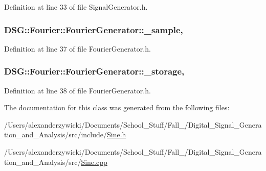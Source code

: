 Definition at line 33 of file Signal\-Generator.\-h.

\hypertarget{classDSG_1_1Fourier_1_1FourierGenerator_aaf63683d2173cd41ff1d65b4c454e87a}{
\subsubsection[{\-\_\-sample}]{ D\-S\-G\-::\-Fourier\-::\-Fourier\-Generator\-::\-\_\-sample\hspace{0.3cm}{\ttfamily [protected]}, {\ttfamily [inherited]}}}\label{classDSG_1_1Fourier_1_1FourierGenerator_aaf63683d2173cd41ff1d65b4c454e87a}


Definition at line 37 of file Fourier\-Generator.\-h.

\hypertarget{classDSG_1_1Fourier_1_1FourierGenerator_a43799227375e2d8b1354682e3a4fc935}{
\subsubsection[{\-\_\-storage}]{ D\-S\-G\-::\-Fourier\-::\-Fourier\-Generator\-::\-\_\-storage\hspace{0.3cm}{\ttfamily [protected]}, {\ttfamily [inherited]}}}\label{classDSG_1_1Fourier_1_1FourierGenerator_a43799227375e2d8b1354682e3a4fc935}


Definition at line 38 of file Fourier\-Generator.\-h.



The documentation for this class was generated from the following files\-:\begin{DoxyCompactItemize}
\item 
/\-Users/alexanderzywicki/\-Documents/\-School\-\_\-\-Stuff/\-Fall\-\_/\-Digital\-\_\-\-Signal\-\_\-\-Generation\-\_\-and\-\_\-\-Analysis/src/include/\hyperlink{Sine_8h}{Sine.\-h}\item 
/\-Users/alexanderzywicki/\-Documents/\-School\-\_\-\-Stuff/\-Fall\-\_/\-Digital\-\_\-\-Signal\-\_\-\-Generation\-\_\-and\-\_\-\-Analysis/src/\hyperlink{Sine_8cpp}{Sine.\-cpp}\end{DoxyCompactItemize}
